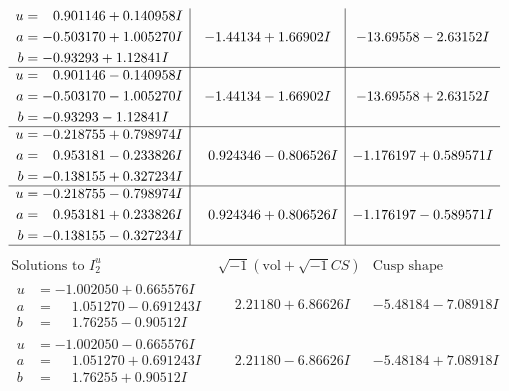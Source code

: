\documentclass[1p]{elsarticle_modified}
\theoremstyle{definition}
\newcommand{\I}{\sqrt{-1}}
\begin{document}
$$\begin{array}{c|c|c}
\begin{aligned}
u &= \phantom{-}0.901146 + 0.140958 I \\
a &= -0.503170 + 1.005270 I \\
b &= -0.93293 + 1.12841 I\end{aligned}
 & -1.44134 + 1.66902 I & -13.69558 - 2.63152 I \\ \hline\begin{aligned}
u &= \phantom{-}0.901146 - 0.140958 I \\
a &= -0.503170 - 1.005270 I \\
b &= -0.93293 - 1.12841 I\end{aligned}
 & -1.44134 - 1.66902 I & -13.69558 + 2.63152 I \\ \hline\begin{aligned}
u &= -0.218755 + 0.798974 I \\
a &= \phantom{-}0.953181 - 0.233826 I \\
b &= -0.138155 + 0.327234 I\end{aligned}
 & \phantom{-}0.924346 - 0.806526 I & -1.176197 + 0.589571 I \\ \hline\begin{aligned}
u &= -0.218755 - 0.798974 I \\
a &= \phantom{-}0.953181 + 0.233826 I \\
b &= -0.138155 - 0.327234 I\end{aligned}
 & \phantom{-}0.924346 + 0.806526 I & -1.176197 - 0.589571 I\\
 \hline 
 \end{array}$$\newpage$$\begin{array}{c|c|c}  
\text{Solutions to }I^u_{2}& \I (\text{vol} + \sqrt{-1}CS) & \text{Cusp shape}\\
 \hline 
\begin{aligned}
u &= -1.002050 + 0.665576 I \\
a &= \phantom{-}1.051270 - 0.691243 I \\
b &= \phantom{-}1.76255 - 0.90512 I\end{aligned}
 & \phantom{-}2.21180 + 6.86626 I & -5.48184 - 7.08918 I \\ \hline\begin{aligned}
u &= -1.002050 - 0.665576 I \\
a &= \phantom{-}1.051270 + 0.691243 I \\
b &= \phantom{-}1.76255 + 0.90512 I\end{aligned}
 & \phantom{-}2.21180 - 6.86626 I & -5.48184 + 7.08918 I \\ \hline\begin{aligned}

\end{aligned}
\end{array}$$
\end{document}
